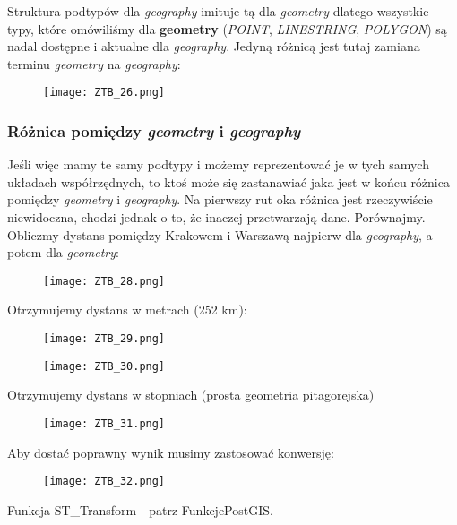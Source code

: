 \documentclass[a4paper,15pt]{article}
\newcommand{\example}[2]{
    \begin{tcolorbox}[colback=blue!5!white,colframe=blue,title={Przykład #1}]
        #2
    \end{tcolorbox}
}
\begin{document}
Struktura podtypów dla \textit{geography} imituje tą dla \textit{geometry} dlatego wszystkie typy, które omówiliśmy dla \textbf{geometry} (\textit{POINT}, \textit{LINESTRING}, \textit{POLYGON}) są nadal dostępne i aktualne dla \textit{geography}. Jedyną różnicą jest tutaj zamiana terminu \textit{geometry} na \textit{geography}:

\example{}{
\begin{figure}[H]
\centering
  \texttt{[image: ZTB\_26.png]}
\end{figure}
}


\subsubsection{Różnica pomiędzy \textit{geometry} i \textit{geography}}
Jeśli więc mamy te samy podtypy i możemy reprezentować je w tych samych układach współrzędnych, to ktoś może się zastanawiać jaka jest w końcu różnica pomiędzy \textit{geometry} i \textit{geography}. Na pierwszy rut oka różnica jest rzeczywiście niewidoczna, chodzi jednak o to, że inaczej przetwarzają dane. Porównajmy. Obliczmy dystans pomiędzy Krakowem i Warszawą najpierw dla \textit{geography}, a potem dla \textit{geometry}:

\example{ - \textit{geography}}{
\begin{figure}[H]
\centering
  \texttt{[image: ZTB\_28.png]}
\end{figure}
Otrzymujemy dystans w metrach (252 km):
\begin{figure}[H]
\centering
  \texttt{[image: ZTB\_29.png]}
\end{figure}
}

\example{ - \textit{geometry} - niepoprawy wynik}{
\begin{figure}[H]
\centering
  \texttt{[image: ZTB\_30.png]}
\end{figure}
Otrzymujemy dystans w stopniach (prosta geometria pitagorejska)
\begin{figure}[H]
\centering
  \texttt{[image: ZTB\_31.png]}
\end{figure}
}

Aby dostać poprawny wynik musimy zastosować konwersję:


\example{ - \textit{geometry} - poprawy wynik}{
\begin{figure}[H]
\centering
  \texttt{[image: ZTB\_32.png]}
\end{figure}
}
Funkcja ST\_Transform - patrz FunkcjePostGIS.
\end{document}
